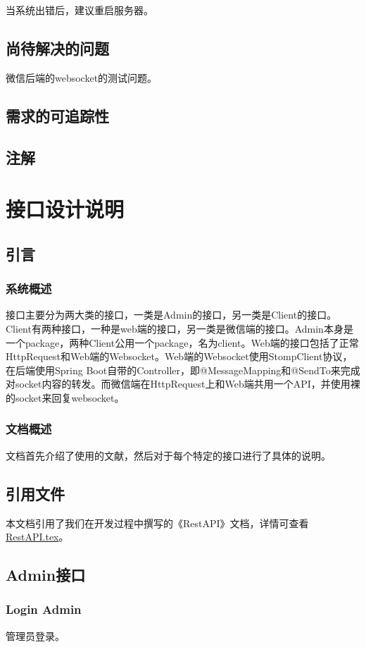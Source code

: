\documentclass{article}
\begin{document}
			当系统出错后，建议重启服务器。
		\subsection{尚待解决的问题}
			微信后端的websocket的测试问题。
		\subsection{需求的可追踪性}
		\subsection{注解}

	\section{接口设计说明}
		\label{接口设计说明}
		\subsection{引言}
			\subsubsection{系统概述}
				接口主要分为两大类的接口，一类是Admin的接口，另一类是Client的接口。Client有两种接口，一种是web端的接口，另一类是微信端的接口。Admin本身是一个package，两种Client公用一个package，名为client。Web端的接口包括了正常HttpRequest和Web端的Websocket。Web端的Websocket使用StompClient协议，在后端使用Spring Boot自带的Controller，即@MessageMapping和@SendTo来完成对socket内容的转发。而微信端在HttpRequest上和Web端共用一个API，并使用裸的socket来回复websocket。
			\subsubsection{文档概述}
				文档首先介绍了使用的文献，然后对于每个特定的接口进行了具体的说明。
		\subsection{引用文件}
			本文档引用了我们在开发过程中撰写的《RestAPI》文档，详情可查看\href{https://github.com/wenj/tomatodesign/blob/master/REST%20API.tex}{RestAPI.tex}。

		\subsection{Admin接口}

\subsubsection{Login Admin}
管理员登录。
\end{document}
